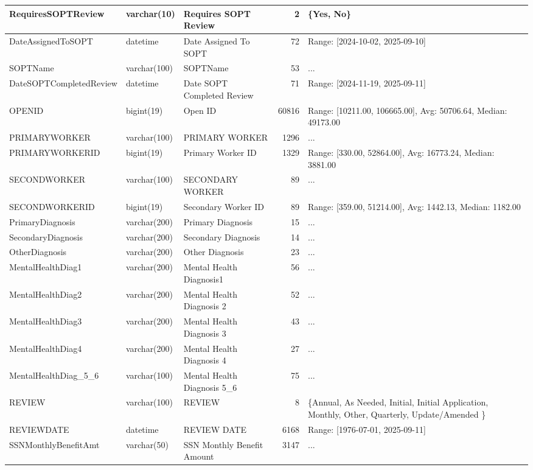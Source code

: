 \begin{landscape}
\begin{longtable}{|l|l|l|r|p{6cm}|}
\hline
RequiresSOPTReview & varchar(10) & Requires SOPT Review & 2 & \{Yes, No\} \\
\hline
DateAssignedToSOPT & datetime & Date Assigned To SOPT & 72 & Range: [2024-10-02, 2025-09-10] \\
\hline
SOPTName & varchar(100) & SOPTName & 53 & ... \\
\hline
DateSOPTCompletedReview & datetime & Date SOPT Completed Review & 71 & Range: [2024-11-19, 2025-09-11] \\
\hline
OPENID & bigint(19) & Open ID & 60816 & Range: [10211.00, 106665.00], Avg: 50706.64, Median: 49173.00 \\
\hline
PRIMARYWORKER & varchar(100) & PRIMARY WORKER & 1296 & ... \\
\hline
PRIMARYWORKERID & bigint(19) & Primary Worker ID & 1329 & Range: [330.00, 52864.00], Avg: 16773.24, Median: 3881.00 \\
\hline
SECONDWORKER & varchar(100) & SECONDARY WORKER & 89 & ... \\
\hline
SECONDWORKERID & bigint(19) & Secondary Worker ID & 89 & Range: [359.00, 51214.00], Avg: 1442.13, Median: 1182.00 \\
\hline
PrimaryDiagnosis & varchar(200) & Primary Diagnosis & 15 & ... \\
\hline
SecondaryDiagnosis & varchar(200) & Secondary Diagnosis & 14 & ... \\
\hline
OtherDiagnosis & varchar(200) & Other Diagnosis & 23 & ... \\
\hline
MentalHealthDiag1 & varchar(200) & Mental Health Diagnosis1 & 56 & ... \\
\hline
MentalHealthDiag2 & varchar(200) & Mental Health Diagnosis 2 & 52 & ... \\
\hline
MentalHealthDiag3 & varchar(200) & Mental Health Diagnosis 3 & 43 & ... \\
\hline
MentalHealthDiag4 & varchar(200) & Mental Health Diagnosis 4 & 27 & ... \\
\hline
MentalHealthDiag\_5\_6 & varchar(100) & Mental Health Diagnosis 5\_6 & 75 & ... \\
\hline
REVIEW & varchar(100) & REVIEW & 8 & \{Annual, As Needed, Initial, Initial Application, Monthly, Other, Quarterly, Update/Amended \} \\
\hline
REVIEWDATE & datetime & REVIEW DATE & 6168 & Range: [1976-07-01, 2025-09-11] \\
\hline
SSNMonthlyBenefitAmt & varchar(50) & SSN Monthly Benefit Amount & 3147 & ... \\

\end{longtable}
\end{landscape}
